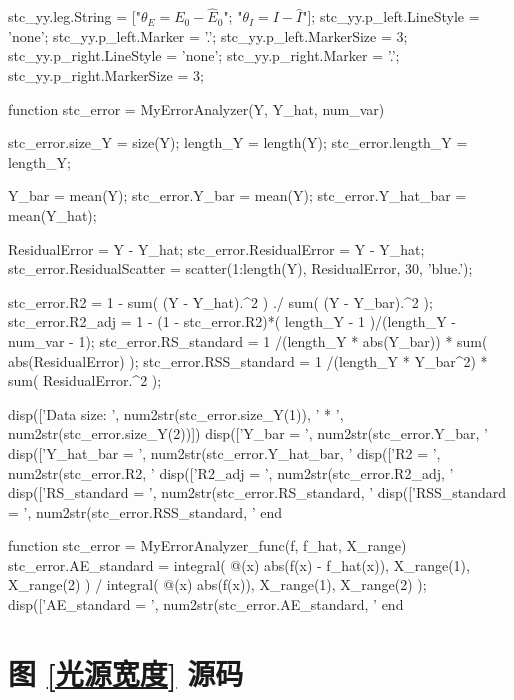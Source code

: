 \documentclass[UTF8]{report}
\theoremstyle{MyLineTheoremStyle} %
\theoremstyle{MyBlockTheoremStyle} %
\theoremstyle{MySubsubsectionStyle} %
\begin{document}
\begin{matlablisting}
stc_yy.leg.String = ["$\theta_E = E_0 - \hat{E}_0$"; "$\theta_I = I - \hat{I}$"];
stc_yy.p_left.LineStyle = 'none';
stc_yy.p_left.Marker = '.';
stc_yy.p_left.MarkerSize = 3;
stc_yy.p_right.LineStyle = 'none';
stc_yy.p_right.Marker = '.';
stc_yy.p_right.MarkerSize = 3;

  function stc_error = MyErrorAnalyzer(Y, Y_hat, num_var)

  stc_error.size_Y = size(Y);
  length_Y = length(Y); stc_error.length_Y = length_Y;

  Y_bar = mean(Y); stc_error.Y_bar = mean(Y); 
  stc_error.Y_hat_bar = mean(Y_hat);


  ResidualError = Y - Y_hat; stc_error.ResidualError = Y - Y_hat;
  stc_error.ResidualScatter = scatter(1:length(Y), ResidualError, 30, 'blue.');

  stc_error.R2 = 1 - sum( (Y - Y_hat).^2 ) ./ sum( (Y - Y_bar).^2 );
  stc_error.R2_adj = 1 - (1 - stc_error.R2)*( length_Y - 1 )/(length_Y - num_var - 1); 
  stc_error.RS_standard = 1 /(length_Y * abs(Y_bar)) * sum( abs(ResidualError) );
  stc_error.RSS_standard =  1 /(length_Y * Y_bar^2) * sum( ResidualError.^2 );

  disp(['Data size: ', num2str(stc_error.size_Y(1)), ' * ',  num2str(stc_error.size_Y(2))])
  disp(['Y_bar     = ', num2str(stc_error.Y_bar, '%
  disp(['Y_hat_bar = ', num2str(stc_error.Y_hat_bar, '%
  disp(['R2 = ', num2str(stc_error.R2, '%
  disp(['R2_adj = ', num2str(stc_error.R2_adj, '%
  disp(['RS_standard = ', num2str(stc_error.RS_standard, '%
  disp(['RSS_standard = ', num2str(stc_error.RSS_standard, '%
end

function stc_error = MyErrorAnalyzer_func(f, f_hat, X_range)
  stc_error.AE_standard = integral( @(x) abs(f(x) - f_hat(x)), X_range(1), X_range(2) ) / integral( @(x) abs(f(x)), X_range(1), X_range(2) );
   disp(['AE_standard = ', num2str(stc_error.AE_standard, '%
end
\end{matlablisting}

\section{图 \ref{光源宽度} 源码}\label{光源宽度 源码}
\end{document}
